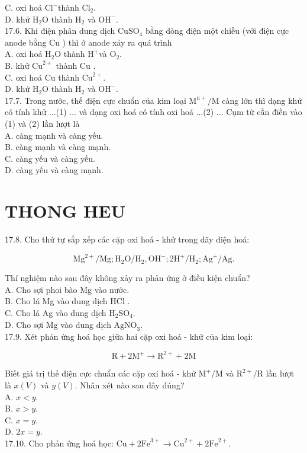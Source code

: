 \documentclass[10pt]{article}
\begin{document}
C. oxi hoá $\mathrm{Cl}^{-}$thành $\mathrm{Cl}_{2}$.\\
D. khử $\mathrm{H}_{2} \mathrm{O}$ thành $\mathrm{H}_{2}$ và $\mathrm{OH}^{-}$.\\
17.6. Khi điện phân dung dịch $\mathrm{CuSO}_{4}$ bằng dòng điện một chiều (với điện cực anode bằng Cu ) thì ở anode xảy ra quá trình\\
A. oxi hoá $\mathrm{H}_{2} \mathrm{O}$ thành $\mathrm{H}^{+}$và $\mathrm{O}_{2}$.\\
B. khử $\mathrm{Cu}^{2+}$ thành Cu .\\
C. oxi hoá Cu thành $\mathrm{Cu}^{2+}$.\\
D. khử $\mathrm{H}_{2} \mathrm{O}$ thành $\mathrm{H}_{2}$ và $\mathrm{OH}^{-}$.\\
17.7. Trong nước, thế điện cực chuẩn của kim loại $\mathrm{M}^{\mathrm{n}+} / \mathrm{M}$ càng lớn thì dạng khử có tính khử ...(1) ... và dạng oxi hoá có tính oxi hoá ...(2) ... Cụm từ cần điền vào (1) và (2) lần lượt là\\
A. càng mạnh và càng yếu.\\
B. càng mạnh và càng mạnh.\\
C. càng yếu và càng yếu.\\
D. càng yếu và càng mạnh.

\section*{THONG HEU}
17.8. Cho thứ tự sắp xếp các cặp oxi hoá - khử trong dãy điện hoá:

$$
\mathrm{Mg}^{2+} / \mathrm{Mg} ; \mathrm{H}_{2} \mathrm{O} / \mathrm{H}_{2}, \mathrm{OH}^{-} ; 2 \mathrm{H}^{+} / \mathrm{H}_{2} ; \mathrm{Ag}^{+} / \mathrm{Ag} .
$$

Thí nghiệm nào sau đây không xảy ra phản ứng ở điều kiện chuẩn?\\
A. Cho sợi phoi bào Mg vào nước.\\
B. Cho lá Mg vào dung dịch HCl .\\
C. Cho lá Ag vào dung dịch $\mathrm{H}_{2} \mathrm{SO}_{4}$.\\
D. Cho sợi Mg vào dung dịch $\mathrm{AgNO}_{3}$.\\
17.9. Xét phản ứng hoá học giữa hai cặp oxi hoá - khử của kim loại:

$$
\mathrm{R}+2 \mathrm{M}^{+} \longrightarrow \mathrm{R}^{2+}+2 \mathrm{M}
$$

Biết giá trị thế điện cực chuẩn các cặp oxi hoá - khử $\mathrm{M}^{+} / \mathrm{M}$ và $\mathrm{R}^{2+} / \mathrm{R}$ lần lượt là $x(V)$ và $y(V)$. Nhân xét nào sau đây đúng?\\
A. $x<y$.\\
B. $x>y$.\\
C. $x=y$.\\
D. $2 x=y$.\\
17.10. Cho phản ứng hoá học: $\mathrm{Cu}+2 \mathrm{Fe}^{3+} \longrightarrow \mathrm{Cu}^{2+}+2 \mathrm{Fe}^{2+}$.
\end{document}
